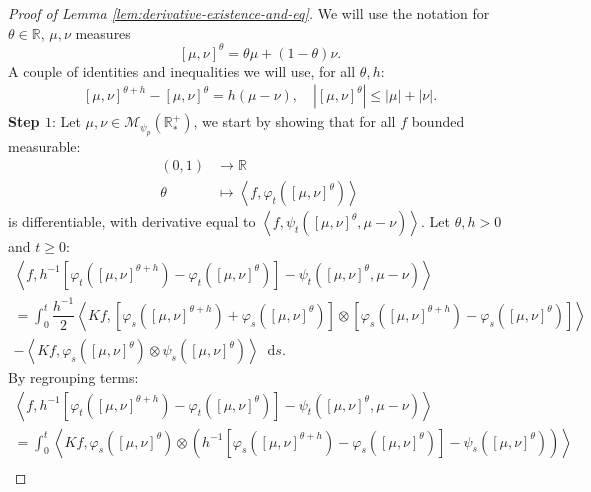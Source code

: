 \documentclass[11pt,a4paper]{article}
\newcommand{\RR}{\mathbb{R}}
\newcommand{\RRP}{\mathbb{R}^+_*}
\newcommand{\MC}{\mathcal{M}}
\newcommand{\brac}[1]{\left\langle#1\right\rangle}
\newcommand{\dd}{\mathop{}\!\mathrm{d}}
\begin{document}
\begin{proof}[Proof of Lemma \ref{lem:derivative-existence-and-eq}]
    We will use the notation for $\theta \in \RR$, $\mu,\nu $ measures 
    \[
    \left[\mu,\nu \right]^\theta = \theta\mu + (1-\theta)\nu.
    \]
    A couple of identities and inequalities we will use, for all $\theta, h$:
    \begin{align*}
        \left[\mu,\nu \right]^{\theta+h} - \left[\mu,\nu \right]^{\theta} = h(\mu - \nu),\quad \left|\left[\mu,\nu \right]^{\theta}\right| \leq |\mu| + |\nu|.
    \end{align*}
    \textbf{Step $1$}: Let $\mu,\nu \in \MC_{\psi_{p}}(\RRP)$, we start by showing that for all $f$  bounded measurable:
    \begin{align*}
        (0,1) &\to \RR \\
        \theta &\mapsto \brac{f,\varphi_t\left(\left[\mu,\nu \right]^\theta\right)}
    \end{align*}
    is differentiable, with derivative equal to $\brac{f,\psi_t\left(\left[\mu,\nu \right]^\theta,\mu-\nu\right)}$. Let $\theta,h > 0$ and $t \geq 0$:
    \begin{multline*}
        \brac{f,h^{-1}\left[\varphi_t\left(\left[\mu,\nu \right]^{\theta+h} \right) - \varphi_t\left(\left[\mu,\nu \right]^{\theta} \right) \right] - \psi_t\left(\left[\mu,\nu \right]^\theta,\mu-\nu\right)} \\
        = \int_0^t \dfrac{h^{-1}}{2}\brac{Kf,\left[\varphi_s\left(\left[\mu,\nu \right]^{\theta+h} \right) + \varphi_s\left(\left[\mu,\nu \right]^{\theta} \right)\right]\otimes \left[\varphi_s\left(\left[\mu,\nu \right]^{\theta+h} \right) - \varphi_s\left(\left[\mu,\nu \right]^{\theta} \right)\right]} \\
        - \brac{Kf,\varphi_s\left(\left[\mu,\nu \right]^{\theta}\right)\otimes \psi_s\left(\left[\mu,\nu \right]^{\theta}\right) }\dd s.
    \end{multline*}
    By regrouping terms:
    \begin{multline*}
        \brac{f,h^{-1}\left[\varphi_t\left(\left[\mu,\nu \right]^{\theta+h} \right) - \varphi_t\left(\left[\mu,\nu \right]^{\theta} \right) \right] - \psi_t\left(\left[\mu,\nu \right]^\theta,\mu-\nu\right)} \\
        = \int_0^t \brac{Kf,\varphi_s\left(\left[\mu,\nu \right]^{\theta} \right)\otimes \left(h^{-1}\left[\varphi_s\left(\left[\mu,\nu \right]^{\theta+h} \right) - \varphi_s\left(\left[\mu,\nu \right]^{\theta} \right)\right] - \psi_s\left(\left[\mu,\nu \right]^{\theta}\right)\right)} \\

\end{multline*}
\end{proof}
\end{document}

